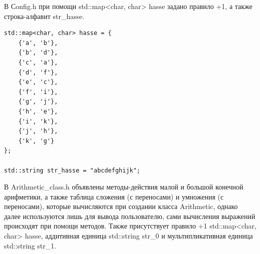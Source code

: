  \par

В Сonfig.h при помощи std::map<char, char> hasse задано правило +1, а также строка-алфавит str\_hasse. 
\begin{lstlisting}[caption=Сonfig.h, label=lst:Сonfig.h]
std::map<char, char> hasse = {
    {'a', 'b'},
    {'b', 'd'},
    {'c', 'a'},
    {'d', 'f'},
    {'e', 'c'},
    {'f', 'i'},
    {'g', 'j'},
    {'h', 'e'},
    {'i', 'k'},
    {'j', 'h'},
    {'k', 'g'}
};

std::string str_hasse = "abcdefghijk";
\end{lstlisting}

 \par

В Arithmetic\_class.h объявлены методы-действия малой и большой конечной арифметики, а также таблица сложения (с переносами) и умножения (с переносами), которые вычисляются при создании класса Arithmetic, однако далее используются лишь для вывода пользователю, сами вычисления выражений происходят при помощи методов. Также присутствует правило +1 std::map<char, char> hasse, аддитивная единица std::string str\_0 и мультипликативная единица std::string str\_1.

